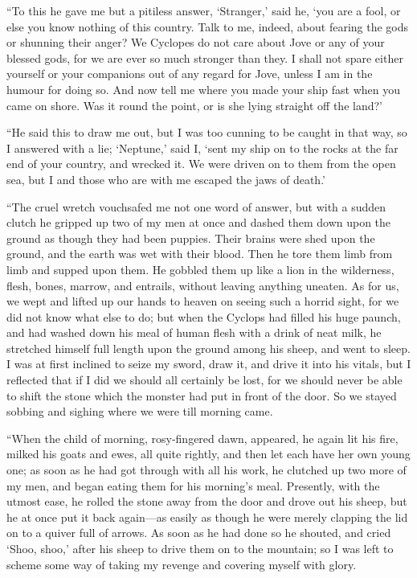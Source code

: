 “To this he gave me but a pitiless answer, ‘Stranger,’ said he, ‘you are a
fool, or else you know nothing of this country. Talk to me, indeed, about
fearing the gods or shunning their anger? We Cyclopes do not care about Jove or
any of your blessed gods, for we are ever so much stronger than they. I shall
not spare either yourself or your companions out of any regard for Jove, unless
I am in the humour for doing so. And now tell me where you made your ship fast
when you came on shore. Was it round the point, or is she lying straight off
the land?’

“He said this to draw me out, but I was too cunning to be caught in that way,
so I answered with a lie; ‘Neptune,’ said I, ‘sent my ship on to the rocks at
the far end of your country, and wrecked it. We were driven on to them from the
open sea, but I and those who are with me escaped the jaws of death.’

“The cruel wretch vouchsafed me not one word of answer, but with a sudden
clutch he gripped up two of my men at once and dashed them down upon the ground
as though they had been puppies. Their brains were shed upon the ground, and
the earth was wet with their blood. Then he tore them limb from limb and supped
upon them. He gobbled them up like a lion in the wilderness, flesh, bones,
marrow, and entrails, without leaving anything uneaten. As for us, we wept and
lifted up our hands to heaven on seeing such a horrid sight, for we did not
know what else to do; but when the Cyclops had filled his huge paunch, and had
washed down his meal of human flesh with a drink of neat milk, he stretched
himself full length upon the ground among his sheep, and went to sleep. I was
at first inclined to seize my sword, draw it, and drive it into his vitals, but
I reflected that if I did we should all certainly be lost, for we should never
be able to shift the stone which the monster had put in front of the door. So
we stayed sobbing and sighing where we were till morning came.

“When the child of morning, rosy-fingered dawn, appeared, he again lit his
fire, milked his goats and ewes, all quite rightly, and then let each have her
own young one; as soon as he had got through with all his work, he clutched up
two more of my men, and began eating them for his morning’s meal. Presently,
with the utmost ease, he rolled the stone away from the door and drove out his
sheep, but he at once put it back again—as easily as though he were merely
clapping the lid on to a quiver full of arrows. As soon as he had done so he
shouted, and cried ‘Shoo, shoo,’ after his sheep to drive them on to the
mountain; so I was left to scheme some way of taking my revenge and covering
myself with glory.

